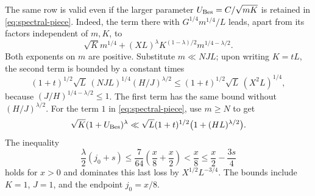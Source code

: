 \documentclass[11pt]{amsart}
\numberwithin{equation}{section}
\theoremstyle{remark}
\begin{document}
The same row is valid even if the larger parameter
\(U_{\rm Bes}=C/\sqrt{mK}\) is retained in
\eqref{eq:spectral-piece}. Indeed, the term there with
\(G^{1/4}m^{1/4}/L\) leads, apart from its factors independent
of \(m,K\), to
\[
 \sqrt K m^{1/4}
    +(XL)^\lambda K^{(1-\lambda)/2}m^{1/4-\lambda/2}.
\]
Both exponents on \(m\) are positive. Substitute \(m\ll NJL\);
upon writing \(K=tL\), the second term is bounded by a constant
times
\[
 (1+t)^{1/2}\sqrt L\,(NJ L)^{1/4}(H/J)^{\lambda/2}
 \le (1+t)^{1/2}\sqrt L\,(X^2 L)^{1/4},
\]
because \((J/H)^{1/4-\lambda/2}\le1\).
The first term has the same bound without \( (H/J)^{\lambda/2}\).
For the term \(1\) in \eqref{eq:spectral-piece}, use \(m\ge N\)
to get
\[
 \sqrt K(1+U_{\rm Bes})^\lambda
 \ll \sqrt L(1+t)^{1/2}\bigl(1+(HL)^{\lambda/2}\bigr).
\]
The inequality
\[
 \frac{\lambda}{2}(j_0+s)\le
 \frac{7}{64}\left(\frac x8+\frac x2\right)
 <\frac x8\le\frac x2-\frac{3s}{4}
\]
holds for \(x>0\) and dominates this last loss by
\(X^{1/2}L^{-3/4}\). The bounds include \(K=1\), \(J=1\), and
the endpoint \(j_0=x/8\).
\end{document}
